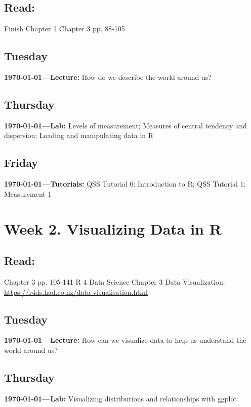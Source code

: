 \subsection{Read:}

\citet{Imai2022-pm} Finish Chapter 1 
\citet{Imai2022-pm} Chapter 3 pp. 88-105 


\subsection{Tuesday} \textbf{\today---Lecture:} How do we describe the world around us?
\AdvanceDate[2]

\subsection{Thursday} \textbf{\today---Lab:} Levels of measurement; Measures of central tendency and dispersion; Loading and manipulating data in R
\AdvanceDate[1]
\subsection{Friday} \textbf{\today---Tutorials:} 
QSS Tutorial 0: Introduction to R; QSS Tutorial 1: Measurement 1
\AdvanceDate[4]



\vspace{2em}


\section{Week 2. Visualizing Data in R}

\subsection{Read:}

\citet{Imai2022-pm} Chapter 3 pp. 105-141
R 4 Data Science Chapter 3 Data Visualization: \url{https://r4ds.had.co.nz/data-visualisation.html}


\subsection{Tuesday} \textbf{\today---Lecture:} How can we visualize data to help us understand the world around us?
\AdvanceDate[2]

\subsection{Thursday} \textbf{\today---Lab:} Visualizing distributions and relationships with ggplot
\AdvanceDate[1]
